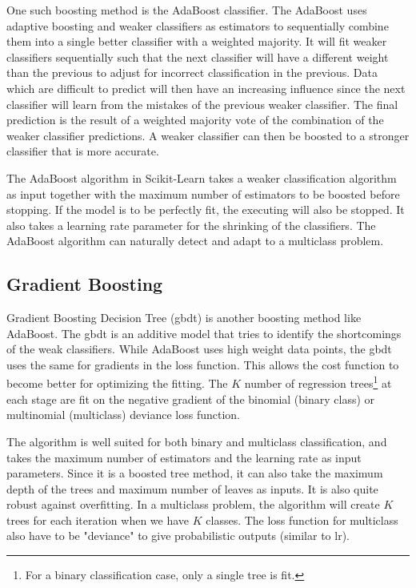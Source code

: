 \documentclass[a4paper, american, 12pt]{report}
\begin{document}
	One such boosting method is the AdaBoost classifier\cite{bagging}\cite{AdaBoost}. The AdaBoost uses adaptive boosting and weaker classifiers as estimators to sequentially combine them into a single better classifier with a weighted majority. It will fit weaker classifiers sequentially such that the next classifier will have a different weight than the previous to adjust for incorrect classification in the previous. Data which are difficult to predict will then have an increasing influence since the next classifier will learn from the mistakes of the previous weaker classifier. The final prediction is the result of a weighted majority vote of the combination of the weaker classifier predictions. A weaker classifier can then be boosted to a stronger classifier that is more accurate.
	
	The AdaBoost algorithm in Scikit-Learn takes a weaker classification algorithm as input together with the maximum number of estimators to be boosted before stopping. If the model is to be perfectly fit, the executing will also be stopped. It also takes a learning rate parameter for the shrinking of the classifiers. The AdaBoost algorithm can naturally detect and adapt to a multiclass problem.
	
	
	\subsection{Gradient Boosting}
	\label{subsect:Theory-GradientBoost}
	Gradient Boosting Decision Tree (\acrshort{gbdt})\cite{GradientBoost} is another boosting method like AdaBoost. The \acrshort{gbdt} is an additive model that tries to identify the shortcomings of the weak classifiers. While AdaBoost uses high weight data points, the \acrshort{gbdt} uses the same for gradients in the loss function. This allows the cost function to become better for optimizing the fitting. The $K$ number of regression trees\footnote{For a binary classification case, only a single tree is fit.} at each stage are fit on the negative gradient of the binomial (binary class) or multinomial (multiclass) deviance loss function.
	
	The algorithm is well suited for both binary and multiclass classification, and takes the maximum number of estimators and the learning rate as input parameters. Since it is a boosted tree method, it can also take the maximum depth of the trees and maximum number of leaves as inputs. It is also quite robust against overfitting. In a multiclass problem, the algorithm will create $K$ trees for each iteration when we have $K$ classes. The loss function for multiclass also have to be "deviance" to give probabilistic outputs (similar to \acrshort{lr}).
	
\end{document}
